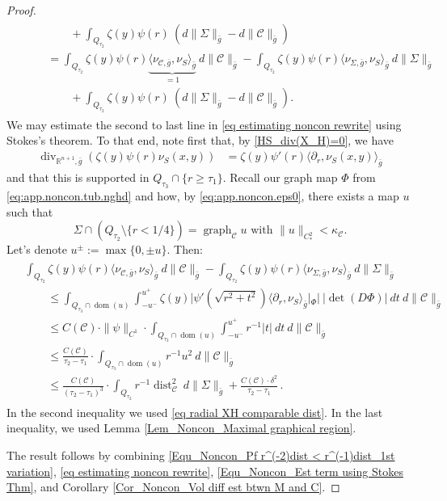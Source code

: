 \documentclass[11pt, letterpaper, reqno]{amsart}
\numberwithin{equation}{section}
\theoremstyle{remark}
\newcommand{\RR}{\mathbb{R}}
\newcommand{\cC}{\mathcal{C}}
\newcommand{\Div}{\operatorname{div}}
\newcommand{\graph}{\operatorname{graph}}
\newcommand{\dist}{\operatorname{dist}}
\DeclareMathOperator{\Dom}{dom}
\begin{document}
\begin{proof}
\begin{align}
\begin{split}
     & \qquad \qquad + \int_{Q_{\tau_2}}\zeta(y)\psi(r) \ (d\|\Sigma\|_{\bar g} - d\|\cC\|_{\bar g}) \\
     & \qquad = \int_{Q_{\tau_2}}\zeta(y)\psi(r) \underbrace{\langle \nu_{\cC,\bar g}, \nu_{{S}} \rangle_{\bar g}}_{=1} \ d\|\cC\|_{\bar g} - \int_{Q_{\tau_2}}\zeta(y)\psi(r) \langle \nu_{\Sigma,\bar g}, \nu_{{S}} \rangle_{\bar g} \ d\|\Sigma\|_{\bar g} \\
     & \qquad \qquad + \int_{Q_{\tau_2}}\zeta(y)\psi(r) \ (d\|\Sigma\|_{\bar g} - d\|\cC\|_{\bar g}).     
    \end{split}
    \end{align}
    We may estimate the second to last line in \eqref{eq estimating noncon rewrite} using Stokes's theorem. To that end, note first that, by \eqref{HS_div(X_H)=0}, we have 
    \begin{align*}
       \Div_{\RR^{n+1},\bar g}\left(\zeta(y)\psi(r)  \nu_{{S}}(x, y)\right)
      & = \zeta(y) \psi'(r) \langle \partial_r, \nu_{{S}}(x, y) \rangle_{\bar g} 
    \end{align*}
    and that this is supported in $Q_{\tau_3} \cap \{r \geq \tau_1\}$. Recall our graph map $\Phi$ from \eqref{eq:app.noncon.tub.nghd} and how, by \eqref{eq:app.noncon.eps0}, there exists a map $u$ such that
    \[ \Sigma \cap (Q_{\tau_2} \setminus \{r < 1/4\}) = \graph_\cC u \text{ with } \| u \|_{C^2_*} < \kappa_\cC. \]
    Let's denote $u^{\pm}:= \max\{0, \pm u\}$. Then:
        \begin{align}
    \begin{split}
      & \int_{Q_{\tau_2}} \zeta(y)\psi(r) \langle \nu_{\cC,\bar g}, \nu_{{S}} \rangle_{\bar g} \ d\|\cC\|_{\bar g} - \int_{Q_{\tau_2}} \zeta(y)\psi(r) \langle \nu_{\Sigma,\bar g}, \nu_{{S}} \rangle_{\bar g} \ d\|\Sigma\|_{\bar g} \\
      & \qquad \leq \int_{Q_{\tau_3} \cap \Dom(u)}\int_{-u^-}^{u^+} \zeta(y) \big|\psi'(\sqrt{r^2+t^2}) \langle \partial_r, \nu_{{S}} \rangle_{\bar g}|_{\Phi}\big|\ | \det(D\Phi)| \ dt\ d\|\cC\|_{\bar g}\\
        & \qquad \leq C(\cC) \cdot \|\psi\|_{C^1} \cdot \int_{Q_{\tau_3}\cap \Dom(u)}\int_{-u^-}^{u^+} r^{-1}|t|\ dt \ d\|\cC\|_{\bar g}  \\
        & \qquad \leq \frac{C(\cC)}{\tau_2-\tau_1} \cdot \int_{Q_{\tau_3} \cap \Dom(u)} r^{-1}u^2 \ d\|\cC\|_{\bar g} \\
        & \qquad \leq \frac{C(\cC)}{(\tau_2-\tau_1)^3} \cdot \int_{Q_{\tau_2}} r^{-1}\dist_\cC^2 \ d\|\Sigma\|_{\bar g} + \frac{C(\cC)\cdot \delta^2}{\tau_2-\tau_1} \,.
    \end{split} \label{Equ_Noncon_Est term using Stokes Thm}
    \end{align}
    In the second inequality we used \eqref{eq radial XH comparable dist}. In the last inequality, we used Lemma \ref{Lem_Noncon_Maximal graphical region}. 

The result follows by combining \eqref{Equ_Noncon_Pf r^(-2)dist < r^(-1)dist_1st variation}, \eqref{eq estimating noncon rewrite}, \eqref{Equ_Noncon_Est term using Stokes Thm}, and Corollary \ref{Cor_Noncon_Vol diff est btwn M and C}.
   \end{proof}
\end{document}
